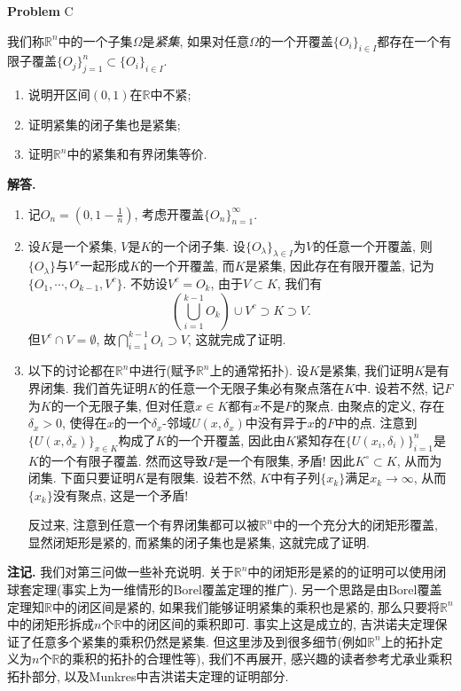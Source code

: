\documentclass{article}
\newcounter{problemname}
\newenvironment{problem}{\begin{shaded}\stepcounter{problemname}\par\noindent\textbf{Problem }}{\end{shaded}\par}
\newenvironment{solution}{\par\noindent\textbf{解答. }}{\par}
\newenvironment{note}{\par\noindent\textbf{注记. }}{\par}
\begin{document}
\begin{problem}{C}\par
我们称$\mathbb{R}^n$中的一个子集$\Omega$是\textit{紧集}, 如果对任意$\Omega$的一个开覆盖$\{O_i\}_{i\in I}$都存在一个有限子覆盖$\{O_j\}_{j=1}^n\subset\{O_i\}_{i\in I}$.
\begin{enumerate}
    \item 说明开区间$(0,1)$在$\mathbb{R}$中不紧;
    \item 证明紧集的闭子集也是紧集;
    \item 证明$\mathbb{R}^n$中的紧集和有界闭集等价.
\end{enumerate}
\end{problem}
\begin{solution}
\begin{enumerate}
    \item 记$O_n=\left(0,1-\frac{1}{n}\right)$, 考虑开覆盖$\{O_n\}_{n=1}^\infty$.
    \item 设$K$是一个紧集, $V$是$K$的一个闭子集. 设$\{O_\lambda\}_{\lambda\in I}$为$V$的任意一个开覆盖, 则$\{O_\lambda\}$与$V^c$一起形成$K$的一个开覆盖, 而$K$是紧集, 因此存在有限开覆盖, 记为$\{O_1,\cdots,O_{k-1},V^c\}$. 不妨设$V^c=O_k$, 由于$V\subset K$, 我们有
    $$
    \left( \bigcup_{i=1}^{k-1}{O_k} \right) \cup V^c\supset K\supset V.
    $$
    但$V^c\cap V=\emptyset$, 故$\bigcap_{i=1}^{k-1}O_i\supset V$, 这就完成了证明.
    \item 以下的讨论都在$\mathbb{R}^n$中进行(赋予$\mathbb{R}^n$上的通常拓扑). 设$K$是紧集, 我们证明$K$是有界闭集. 我们首先证明$K$的任意一个无限子集必有聚点落在$K$中. 设若不然, 记$F$为$K$的一个无限子集, 但对任意$x\in K$都有$x$不是$F$的聚点. 由聚点的定义, 存在$\delta_x>0$, 使得在$x$的一个$\delta_x$-邻域$U(x,\delta_x)$中没有异于$x$的$F$中的点. 注意到$\{U(x,\delta_x)\}_{x\in K}$构成了$K$的一个开覆盖, 因此由$K$紧知存在$\{U(x_i,\delta_i)\}_{i=1}^n$是$K$的一个有限子覆盖. 然而这导致$F$是一个有限集, 矛盾! 因此$K^\circ\subset K$, 从而为闭集. 下面只要证明$K$是有限集. 设若不然, $K$中有子列$\{x_k\}$满足$x_k\to\infty$, 从而$\{x_k\}$没有聚点, 这是一个矛盾!\par
    反过来, 注意到任意一个有界闭集都可以被$\mathbb{R}^n$中的一个充分大的闭矩形覆盖, 显然闭矩形是紧的, 而紧集的闭子集也是紧集, 这就完成了证明.
\end{enumerate}
\end{solution}
\begin{note}
我们对第三问做一些补充说明. 关于$\mathbb{R}^n$中的闭矩形是紧的的证明可以使用闭球套定理(事实上为一维情形的Borel覆盖定理的推广). 另一个思路是由Borel覆盖定理知$\mathbb{R}$中的闭区间是紧的, 如果我们能够证明紧集的乘积也是紧的, 那么只要将$\mathbb{R}^n$中的闭矩形拆成$n$个$\mathbb{R}$中的闭区间的乘积即可. 事实上这是成立的, 吉洪诺夫定理保证了任意多个紧集的乘积仍然是紧集. 但这里涉及到很多细节(例如$\mathbb{R}^n$上的拓扑定义为$n$个$\mathbb{R}$的乘积的拓扑的合理性等), 我们不再展开, 感兴趣的读者参考尤承业乘积拓扑部分, 以及Munkres中吉洪诺夫定理的证明部分.
\end{note}
\newpage
\end{document}
